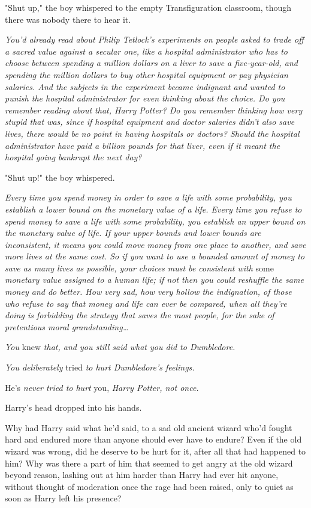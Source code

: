 "Shut up," the boy whispered to the empty Transfiguration classroom, though 
there was nobody there to hear it.

\emph{You'd already read about Philip Tetlock's experiments on people asked to 
trade off a sacred value against a secular one, like a hospital administrator 
who has to choose between spending a million dollars on a liver to save a 
five-year-old, and spending the million dollars to buy other hospital equipment 
or pay physician salaries. And the subjects in the experiment became indignant 
and wanted to punish the hospital administrator for even thinking about the 
choice. Do you remember reading about that, Harry Potter? Do you remember 
thinking how very stupid that was, since if hospital equipment and doctor 
salaries didn't also save lives, there would be no point in having hospitals or 
doctors? Should the hospital administrator have paid a billion pounds for that 
liver, even if it meant the hospital going bankrupt the next day?}

"Shut up!" the boy whispered.

\emph{Every time you spend money in order to save a life with some probability, 
you establish a lower bound on the monetary value of a life. Every time you 
refuse to spend money to save a life with some probability, you establish an 
upper bound on the monetary value of life. If your upper bounds and lower 
bounds are inconsistent, it means you could move money from one place to 
another, and save more lives at the same cost. So if you want to use a bounded 
amount of money to save as many lives as possible, your choices must be 
consistent with} some \emph{monetary value assigned to a human life; if not 
then you could reshuffle the same money and do better. How very sad, how very 
hollow the indignation, of those who refuse to say that money and life can ever 
be compared, when all they're doing is forbidding the strategy that saves the 
most people, for the sake of pretentious moral grandstanding{\ldots}}

\emph{You} knew \emph{that, and you still said what you did to Dumbledore.}

\emph{You deliberately} tried \emph{to hurt Dumbledore's feelings.}

He's \emph{never tried to hurt} you, \emph{Harry Potter, not once.} 

Harry's head dropped into his hands.

Why had Harry said what he'd said, to a sad old ancient wizard who'd fought 
hard and endured more than anyone should ever have to endure? Even if the old 
wizard was wrong, did he deserve to be hurt for it, after all that had happened 
to him? Why was there a part of him that seemed to get angry at the old wizard 
beyond reason, lashing out at him harder than Harry had ever hit anyone, 
without thought of moderation once the rage had been raised, only to quiet as 
soon as Harry left his presence?

